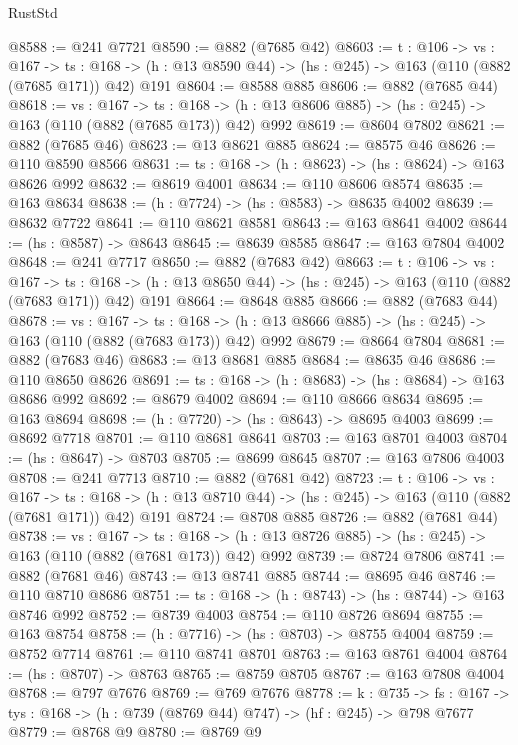 \begin{lexlean}{RustStd}
\begin{coremodule}
@8588 := @241 @7721
@8590 := @882 (@7685 @42)
@8603 := {t : @106} ->
  {vs : @167} ->
  {ts : @168} -> (h : @13 @8590 @44) -> (hs : @245) -> @163 (@110 (@882 (@7685 @171)) @42) @191
@8604 := @8588 @885
@8606 := @882 (@7685 @44)
@8618 := {vs : @167} ->
  {ts : @168} -> (h : @13 @8606 @885) -> (hs : @245) -> @163 (@110 (@882 (@7685 @173)) @42) @992
@8619 := @8604 @7802
@8621 := @882 (@7685 @46)
@8623 := @13 @8621 @885
@8624 := @8575 @46
@8626 := @110 @8590 @8566
@8631 := {ts : @168} -> (h : @8623) -> (hs : @8624) -> @163 @8626 @992
@8632 := @8619 @4001
@8634 := @110 @8606 @8574
@8635 := @163 @8634
@8638 := (h : @7724) -> (hs : @8583) -> @8635 @4002
@8639 := @8632 @7722
@8641 := @110 @8621 @8581
@8643 := @163 @8641 @4002
@8644 := (hs : @8587) -> @8643
@8645 := @8639 @8585
@8647 := @163 @7804 @4002
@8648 := @241 @7717
@8650 := @882 (@7683 @42)
@8663 := {t : @106} ->
  {vs : @167} ->
  {ts : @168} -> (h : @13 @8650 @44) -> (hs : @245) -> @163 (@110 (@882 (@7683 @171)) @42) @191
@8664 := @8648 @885
@8666 := @882 (@7683 @44)
@8678 := {vs : @167} ->
  {ts : @168} -> (h : @13 @8666 @885) -> (hs : @245) -> @163 (@110 (@882 (@7683 @173)) @42) @992
@8679 := @8664 @7804
@8681 := @882 (@7683 @46)
@8683 := @13 @8681 @885
@8684 := @8635 @46
@8686 := @110 @8650 @8626
@8691 := {ts : @168} -> (h : @8683) -> (hs : @8684) -> @163 @8686 @992
@8692 := @8679 @4002
@8694 := @110 @8666 @8634
@8695 := @163 @8694
@8698 := (h : @7720) -> (hs : @8643) -> @8695 @4003
@8699 := @8692 @7718
@8701 := @110 @8681 @8641
@8703 := @163 @8701 @4003
@8704 := (hs : @8647) -> @8703
@8705 := @8699 @8645
@8707 := @163 @7806 @4003
@8708 := @241 @7713
@8710 := @882 (@7681 @42)
@8723 := {t : @106} ->
  {vs : @167} ->
  {ts : @168} -> (h : @13 @8710 @44) -> (hs : @245) -> @163 (@110 (@882 (@7681 @171)) @42) @191
@8724 := @8708 @885
@8726 := @882 (@7681 @44)
@8738 := {vs : @167} ->
  {ts : @168} -> (h : @13 @8726 @885) -> (hs : @245) -> @163 (@110 (@882 (@7681 @173)) @42) @992
@8739 := @8724 @7806
@8741 := @882 (@7681 @46)
@8743 := @13 @8741 @885
@8744 := @8695 @46
@8746 := @110 @8710 @8686
@8751 := {ts : @168} -> (h : @8743) -> (hs : @8744) -> @163 @8746 @992
@8752 := @8739 @4003
@8754 := @110 @8726 @8694
@8755 := @163 @8754
@8758 := (h : @7716) -> (hs : @8703) -> @8755 @4004
@8759 := @8752 @7714
@8761 := @110 @8741 @8701
@8763 := @163 @8761 @4004
@8764 := (hs : @8707) -> @8763
@8765 := @8759 @8705
@8767 := @163 @7808 @4004
@8768 := @797 @7676
@8769 := @769 @7676
@8778 := {k : @735} ->
  {fs : @167} -> {tys : @168} -> (h : @739 (@8769 @44) @747) -> (hf : @245) -> @798 @7677
@8779 := @8768 @9
@8780 := @8769 @9

\end{coremodule}
\end{lexlean}
